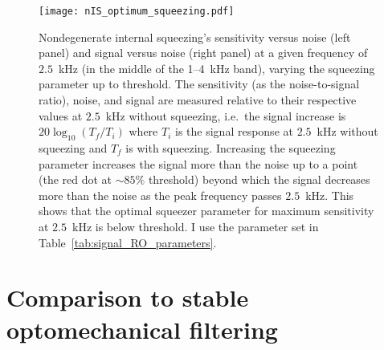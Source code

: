 \begin{figure}[ht!]
    \centering
    \texttt{[image: nIS\_optimum\_squeezing.pdf]}
    \caption{ Nondegenerate internal squeezing's sensitivity versus noise (left panel) and signal versus noise (right panel) at a given frequency of $2.5$~kHz (in the middle of the 1--4~kHz band), varying the squeezing parameter up to threshold. The sensitivity (as the noise-to-signal ratio), noise, and signal are measured relative to their respective values at $2.5$~kHz without squeezing, i.e.\ the signal increase is $20\log_{10}(T_f/T_i)$ where $T_i$ is the signal response at $2.5$~kHz without squeezing and $T_f$ is with squeezing. Increasing the squeezing parameter increases the signal more than the noise up to a point (the red dot at $\sim85\%$ threshold) beyond which the signal decreases more than the noise as the peak frequency passes $2.5$~kHz. This shows that the optimal squeezer parameter for maximum sensitivity at $2.5$~kHz is below threshold. I use the parameter set in Table~\ref{tab:signal_RO_parameters}.
    }
    \label{fig:nIS_optimum_squeezing}
\end{figure}



\section{Comparison to stable optomechanical filtering} %
\label{sec:nIS_vs_sWLC}

